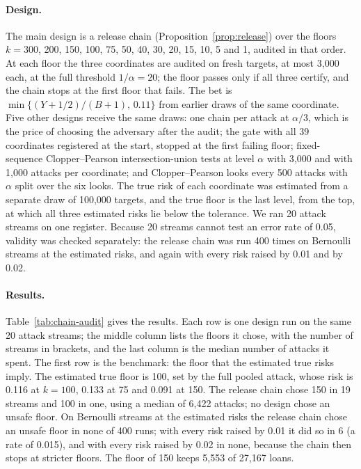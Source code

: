 \paragraph{Design.} The main design is a release chain (Proposition~\ref{prop:release}) over the floors $k=300$, 200, 150, 100, 75, 50, 40, 30, 20, 15, 10, 5 and 1, audited in that order. At each floor the three coordinates are audited on fresh targets, at most 3{,}000 each, at the full threshold $1/\alpha=20$; the floor passes only if all three certify, and the chain stops at the first floor that fails. The bet is $\min\{(Y+1/2)/(B+1),\,0.11\}$ from earlier draws of the same coordinate. Five other designs receive the same draws: one chain per attack at $\alpha/3$, which is the price of choosing the adversary after the audit; the gate with all 39 coordinates registered at the start, stopped at the first failing floor; fixed-sequence Clopper--Pearson intersection-union tests at level $\alpha$ with 3{,}000 and with 1{,}000 attacks per coordinate; and Clopper--Pearson looks every 500 attacks with $\alpha$ split over the six looks. The true risk of each coordinate was estimated from a separate draw of 100{,}000 targets, and the true floor is the last level, from the top, at which all three estimated risks lie below the tolerance. We ran 20 attack streams on one register. Because 20 streams cannot test an error rate of 0.05, validity was checked separately: the release chain was run 400 times on Bernoulli streams at the estimated risks, and again with every risk raised by 0.01 and by 0.02.



\paragraph{Results.} Table~\ref{tab:chain-audit} gives the results. Each row is one design run on the same 20 attack streams; the middle column lists the floors it chose, with the number of streams in brackets, and the last column is the median number of attacks it spent. The first row is the benchmark: the floor that the estimated true risks imply. The estimated true floor is 100, set by the full pooled attack, whose risk is 0.116 at $k=100$, 0.133 at 75 and 0.091 at 150. The release chain chose 150 in 19 streams and 100 in one, using a median of 6{,}422 attacks; no design chose an unsafe floor. On Bernoulli streams at the estimated risks the release chain chose an unsafe floor in none of 400 runs; with every risk raised by 0.01 it did so in 6 (a rate of 0.015), and with every risk raised by 0.02 in none, because the chain then stops at stricter floors. The floor of 150 keeps 5{,}553 of 27{,}167 loans.

